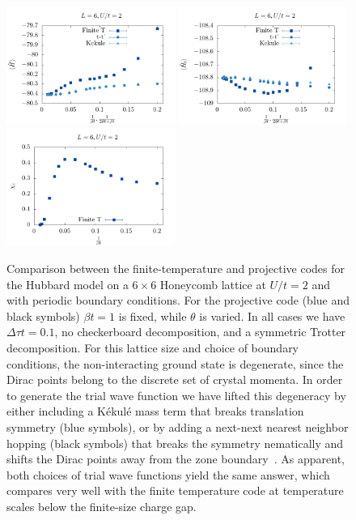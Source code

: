 \begin{figure}
\center
\includegraphics[width=0.49\textwidth]{Figures/Projector/Proj_ener.pdf}
\includegraphics[width=0.49\textwidth]{Figures/Projector/Proj_kin.pdf} \\
\includegraphics[width=0.49\textwidth]{Figures/Projector/Proj_chi.pdf}

	\caption{Comparison between the finite-temperature and projective codes for the Hubbard model on a $6 \times 6 $  Honeycomb lattice at $U/t=2$ and with periodic boundary conditions.   For the projective code (blue and black symbols) $\beta t = 1$ is fixed, while $\theta$ is varied. In all cases we have $\Delta \tau t = 0.1$, no checkerboard decomposition, and a symmetric Trotter decomposition.  For this lattice size and choice of boundary conditions, the non-interacting ground state is degenerate, since the Dirac points belong to the discrete set of crystal momenta.  In order to generate the trial wave function we  have lifted this degeneracy by either including a K\'ekul\'e mass term \cite{Lang13} that breaks translation symmetry (blue symbols), or by adding a next-next nearest neighbor hopping (black symbols) that breaks the symmetry nematically and shifts the Dirac points away from the zone boundary~\cite{Ixert14}. As apparent, both choices of trial wave functions yield the same answer, which compares very well with the finite temperature code at temperature scales below the finite-size charge gap.}
	\label{PQMC.fig}
\end{figure}

